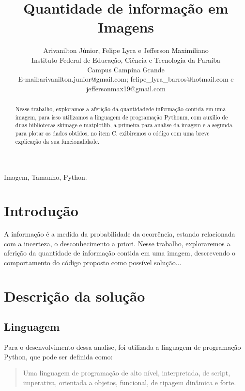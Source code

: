 \documentclass[journal]{IEEEtran}
\begin{document}
\title{Quantidade de informação em Imagens}


\author{Arivanilton Júnior, Felipe Lyra e Jefferson Maximiliano\\

Instituto Federal de Educação, Ciência e Tecnologia da Paraíba\\Campus Campina Grande\\
E-mail:arivanilton.junior@gmail.com; felipe\_lyra\_barros@hotmail.com e jeffersonmax19@gmail.com\\
}



\maketitle


\begin{abstract}
Nesse trabalho, exploramos a aferição da quantidadede informação contida em uma imagem, para isso utilizamos a linguagem de programação Pythonm, com auxilio de duas bibliotecas skimage e matplotlib, a primeira para analise da imagem e a segunda para plotar os dados obtidos, no item C. exibiremos o código com uma breve explicação da sua funcionalidade.

\end{abstract}



\begin{IEEEkeywords}
Imagem, Tamanho, Python.
\end{IEEEkeywords}



\section{Introdução}

 A informação é a medida da probabilidade da ocorrência, estando relacionada com a incerteza, o desconhecimento a priori. Nesse trabalho, exploraremos a aferição da quantidade de informação contida em uma imagem, descrevendo o comportamento do código proposto como possível solução...



\section{Descrição da solução}

\subsection{Linguagem}
    Para o desenvolvimento dessa analise, foi utilizada a linguagem de programação Python, que pode ser definida como:
\begin{quotation}Uma linguagem de programação de alto nível, interpretada, de script, imperativa, orientada a objetos, funcional, de tipagem dinâmica e forte.
\end{quotation}
\end{document}
